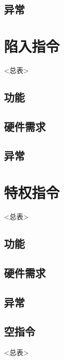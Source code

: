     \subsection{异常}

\section{陷入指令}
<总表>
    \subsection{功能}
    \subsection{硬件需求}
    \subsection{异常}

\section{特权指令}
<总表>
    \subsection{功能}
    \subsection{硬件需求}
    \subsection{异常}

\subsection{空指令}
<总表>
